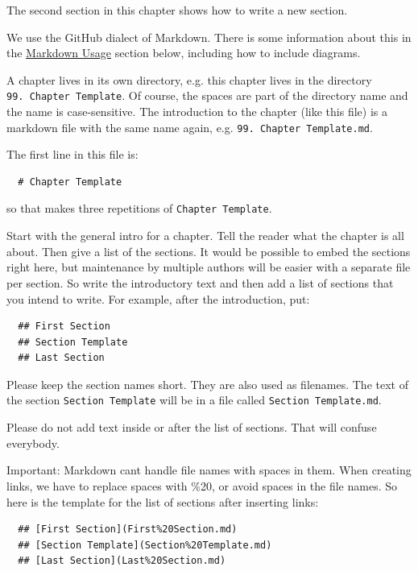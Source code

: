 \documentclass[
]{article}
\begin{document}
The second section in this chapter shows how to write a new section.

We use the GitHub dialect of Markdown. There is some information about
this in the \hyperref[markdown-usage]{Markdown Usage} section below,
including how to include diagrams.

A chapter lives in its own directory, e.g. this chapter lives in the
directory \texttt{99.\ Chapter\ Template}. Of course, the spaces are
part of the directory name and the name is case-sensitive. The
introduction to the chapter (like this file) is a markdown file with the
same name again, e.g. \texttt{99.\ Chapter\ Template.md}.

The first line in this file is:

\begin{verbatim}
  # Chapter Template
\end{verbatim}

so that makes three repetitions of \texttt{Chapter\ Template}.

Start with the general intro for a chapter. Tell the reader what the
chapter is all about. Then give a list of the sections. It would be
possible to embed the sections right here, but maintenance by multiple
authors will be easier with a separate file per section. So write the
introductory text and then add a list of sections that you intend to
write. For example, after the introduction, put:

\begin{verbatim}
  ## First Section
  ## Section Template
  ## Last Section
\end{verbatim}

Please keep the section names short. They are also used as filenames.
The text of the section \texttt{Section\ Template} will be in a file
called \texttt{Section\ Template.md}.

Please do not add text inside or after the list of sections. That will
confuse everybody.

Important: Markdown can\textquotesingle t handle file names with spaces
in them. When creating links, we have to replace spaces with \%20, or
avoid spaces in the file names. So here is the template for the list of
sections after inserting links:

\begin{verbatim}
  ## [First Section](First%20Section.md)
  ## [Section Template](Section%20Template.md)
  ## [Last Section](Last%20Section.md)
\end{verbatim}
\end{document}
